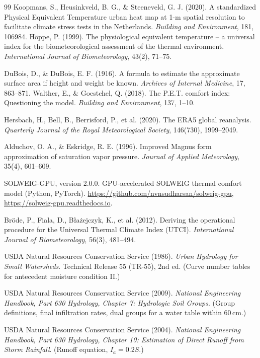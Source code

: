 \documentclass[11pt]{article}
\begin{document}
\begin{thebibliography}{99}
 Koopmans, S., Heusinkveld, B. G., \& Steeneveld, G. J. (2020). A standardized Physical Equivalent Temperature urban heat map at 1-m spatial resolution to facilitate climate stress tests in the Netherlands. \textit{Building and Environment}, 181, 106984.
 Höppe, P. (1999). The physiological equivalent temperature -- a universal index for the biometeorological assessment of the thermal environment. \textit{International Journal of Biometeorology}, 43(2), 71--75.

 DuBois, D., \& DuBois, E. F. (1916). A formula to estimate the approximate surface area if height and weight be known. \textit{Archives of Internal Medicine}, 17, 863--871.
 Walther, E., \& Goestchel, Q. (2018). The P.E.T. comfort index: Questioning the model. \textit{Building and Environment}, 137, 1--10.

 Hersbach, H., Bell, B., Berrisford, P., et al. (2020). The ERA5 global reanalysis. \textit{Quarterly Journal of the Royal Meteorological Society}, 146(730), 1999--2049.

 Alduchov, O. A., \& Eskridge, R. E. (1996). Improved Magnus form approximation of saturation vapor pressure. \textit{Journal of Applied Meteorology}, 35(4), 601--609.

 SOLWEIG-GPU, version 2.0.0. GPU-accelerated SOLWEIG thermal comfort model (Python, PyTorch). \url{https://github.com/nvnsudharsan/solweig-gpu}, \url{https://solweig-gpu.readthedocs.io}.

 Bröde, P., Fiala, D., Błażejczyk, K., et al. (2012). Deriving the operational procedure for the Universal Thermal Climate Index (UTCI). \textit{International Journal of Biometeorology}, 56(3), 481--494.

 USDA Natural Resources Conservation Service (1986). \textit{Urban Hydrology for Small Watersheds}. Technical Release 55 (TR-55), 2nd ed. (Curve number tables for antecedent moisture condition II.)

 USDA Natural Resources Conservation Service (2009). \textit{National Engineering Handbook, Part 630 Hydrology, Chapter 7: Hydrologic Soil Groups}. (Group definitions, final infiltration rates, dual groups for a water table within 60\,cm.)

 USDA Natural Resources Conservation Service (2004). \textit{National Engineering Handbook, Part 630 Hydrology, Chapter 10: Estimation of Direct Runoff from Storm Rainfall}. (Runoff equation, $I_a = 0.2S$.)


\end{thebibliography}
\end{document}
